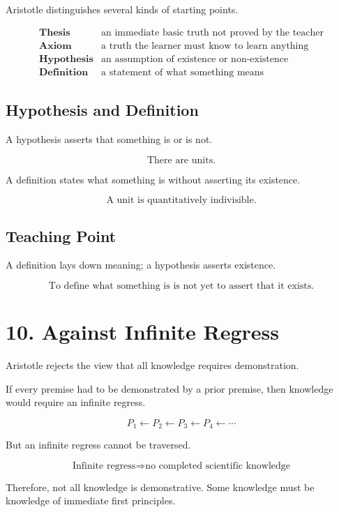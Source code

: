 \documentclass[12pt]{article}
\begin{document}
Aristotle distinguishes several kinds of starting points.

\[
\begin{array}{ll}
\textbf{Thesis} &
\text{an immediate basic truth not proved by the teacher} \\
\textbf{Axiom} &
\text{a truth the learner must know to learn anything} \\
\textbf{Hypothesis} &
\text{an assumption of existence or non-existence} \\
\textbf{Definition} &
\text{a statement of what something means}
\end{array}
\]

\subsection*{Hypothesis and Definition}

A hypothesis asserts that something is or is not.

\[
\text{There are units.}
\]

A definition states what something is without asserting its existence.

\[
\text{A unit is quantitatively indivisible.}
\]

\subsection*{Teaching Point}

A definition lays down meaning; a hypothesis asserts existence.

\[
\boxed{
\text{To define what something is is not yet to assert that it exists.}
}
\]

\section*{10. Against Infinite Regress}

Aristotle rejects the view that all knowledge requires demonstration.

If every premise had to be demonstrated by a prior premise, then knowledge would
require an infinite regress.

\[
P_1 \leftarrow P_2 \leftarrow P_3 \leftarrow P_4 \leftarrow \cdots
\]

But an infinite regress cannot be traversed.

\[
\boxed{
\text{Infinite regress} \Rightarrow \text{no completed scientific knowledge}
}
\]

Therefore, not all knowledge is demonstrative. Some knowledge must be knowledge
of immediate first principles.
\end{document}
